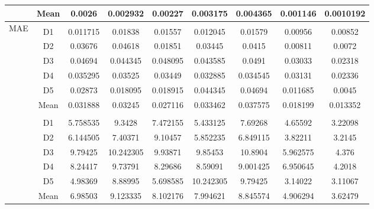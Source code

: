 \documentclass[a4paper, fleqn]{cas-sc}
\begin{document}
\begin{table}[!p]
\begin{tabular}{ccccccccc}
        & Mean & 0.0026 & 0.002932 & 0.00227 & 0.003175 & 0.004365 & 0.001146 & 0.0010192 \\
        \midrule
        \multirow{9}{*}{MAE}\\
        & D1 & 0.011715 & 0.01838 & 0.01557 & 0.012045 & 0.01579 & 0.00956 & 0.00852 \\
        & D2 & 0.03676 & 0.04618 & 0.01851 & 0.03445 & 0.0415 & 0.00811 & 0.0072 \\
        & D3 & 0.04694 & 0.044345 & 0.048095 & 0.043585 & 0.0491 & 0.03033 & 0.02318 \\
        & D4 & 0.035295 & 0.03525 & 0.03449 & 0.032885 & 0.034545 & 0.03131 & 0.02336 \\
        & D5  & 0.02873 & 0.018095 & 0.018915 & 0.044345 & 0.04694 & 0.011685 & 0.0045 \\
        & Mean & 0.031888 & 0.03245 & 0.027116 & 0.033462 & 0.037575 & 0.018199 & 0.013352 \\
        \midrule
        \multirow{9}{*}{MAPE}\\
        & D1 & 5.758535 & 9.3428 & 7.472155 & 5.433125 & 7.69268 & 4.65592 & 3.22098 \\
        & D2 & 6.144505 & 7.40371 & 9.10457 & 5.852235 & 6.849115 & 3.82211 & 3.2145 \\
        & D3 & 9.79425 & 10.242305 & 9.93871 & 9.85453 & 10.8904 & 5.962575 & 4.376 \\
        & D4 & 8.24417 & 9.73791 & 8.29686 & 8.59091 & 9.001425 & 6.950645 & 4.2018 \\
        & D5 & 4.98369 & 8.88995 & 5.698585 & 10.242305 & 9.79425 & 3.14022 & 3.11067 \\
        & Mean & 6.98503 & 9.123335 & 8.102176 & 7.994621 & 8.845574 & 4.906294 & 3.62479 \\
       
        \bottomrule
    \end{tabular}
\end{table}
\end{document}
